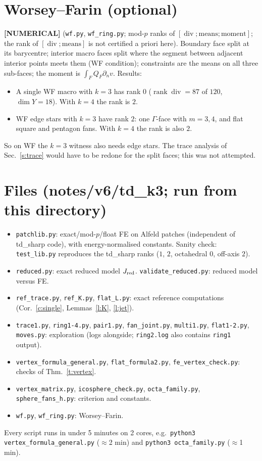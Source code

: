 \documentclass[11pt]{article}
\theoremstyle{definition}
\renewcommand{\div}{\operatorname{div}}
\newcommand{\status}[1]{\textbf{[#1]}}
\begin{document}
\section{Worsey--Farin (optional)}
\status{NUMERICAL} (\texttt{wf.py}, \texttt{wf\_ring.py}; mod-$p$ ranks of $[\div;\text{means};\text{moment}]$; the rank of $[\div;\text{means}]$ is not certified a priori here). Boundary face split at its barycentre; interior macro faces split where the segment between adjacent interior points meets them (WF condition); constraints are the means on all three sub-faces; the moment is $\int_FQ_F\partial_nv$. Results:
\begin{itemize}[leftmargin=1.2em]
\item A single WF macro with $k=3$ has rank $0$ ($\operatorname{rank}\div=87$ of $120$, $\dim Y=18$). With $k=4$ the rank is $2$.
\item WF edge stars with $k=3$ have rank $2$: one $\Gamma$-face with $m=3,4$, and flat square and pentagon fans. With $k=4$ the rank is also $2$.
\end{itemize}
So on WF the $k=3$ witness also needs edge stars. The trace analysis of Sec.~\ref{s:trace} would have to be redone for the split faces; this was not attempted.

\section*{Files (notes/v6/td\_k3; run from this directory)}
\begin{itemize}[leftmargin=1.2em]\small
\item \texttt{patchlib.py}: exact/mod-$p$/float FE on Alfeld patches (independent of td\_sharp code), with energy-normalised constants. Sanity check: \texttt{test\_lib.py} reproduces the td\_sharp ranks ($1$, $2$, octahedral $0$, off-axis $2$).
\item \texttt{reduced.py}: exact reduced model $J_{\rm red}$. \texttt{validate\_reduced.py}: reduced model versus FE.
\item \texttt{ref\_trace.py}, \texttt{ref\_K.py}, \texttt{flat\_L.py}: exact reference computations (Cor.~\ref{c:single}, Lemmas~\ref{l:K}, \ref{l:jet}).
\item \texttt{trace1.py}, \texttt{ring1-4.py}, \texttt{pair1.py}, \texttt{fan\_joint.py}, \texttt{multi1.py}, \texttt{flat1-2.py}, \texttt{moves.py}: exploration (logs alongside; \texttt{ring2.log} also contains \texttt{ring1} output).
\item \texttt{vertex\_formula\_general.py}, \texttt{flat\_formula2.py}, \texttt{fe\_vertex\_check.py}: checks of Thm.~\ref{t:vertex}.
\item \texttt{vertex\_matrix.py}, \texttt{icosphere\_check.py}, \texttt{octa\_family.py}, \texttt{sphere\_fans\_h.py}: criterion and constants.
\item \texttt{wf.py}, \texttt{wf\_ring.py}: Worsey--Farin.
\end{itemize}
Every script runs in under 5 minutes on 2 cores, e.g.\ \texttt{python3 vertex\_formula\_general.py} ($\approx$2 min) and \texttt{python3 octa\_family.py} ($\approx$1 min).
\end{document}
